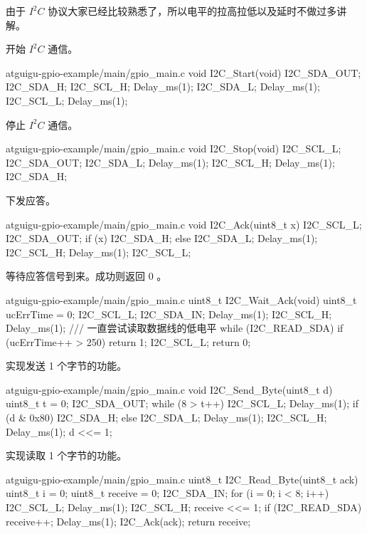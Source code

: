 \documentclass[lang=cn,newtx,10pt,scheme=chinese]{elegantbook}
\begin{document}
由于 $I^2C$ 协议大家已经比较熟悉了，所以电平的拉高拉低以及延时不做过多讲解。

开始 $I^2C$ 通信。

\begin{mycode}{atguigu-gpio-example/main/gpio\_main.c}
void I2C_Start(void)
{
    I2C_SDA_OUT;
    I2C_SDA_H;
    I2C_SCL_H;
    Delay_ms(1);
    I2C_SDA_L;
    Delay_ms(1);
    I2C_SCL_L;
    Delay_ms(1);
}
\end{mycode}

停止 $I^2C$ 通信。

\begin{mycode}{atguigu-gpio-example/main/gpio\_main.c}
void I2C_Stop(void)
{
    I2C_SCL_L;
    I2C_SDA_OUT;
    I2C_SDA_L;
    Delay_ms(1);
    I2C_SCL_H;
    Delay_ms(1);
    I2C_SDA_H;
}
\end{mycode}

下发应答。

\begin{mycode}{atguigu-gpio-example/main/gpio\_main.c}
void I2C_Ack(uint8_t x)
{
    I2C_SCL_L;
    I2C_SDA_OUT;
    if (x)
    {
        I2C_SDA_H;
    }
    else
    {
        I2C_SDA_L;
    }
    Delay_ms(1);
    I2C_SCL_H;
    Delay_ms(1);
    I2C_SCL_L;
}
\end{mycode}

等待应答信号到来。成功则返回 0 。

\begin{mycode}{atguigu-gpio-example/main/gpio\_main.c}
uint8_t I2C_Wait_Ack(void)
{
    uint8_t ucErrTime = 0;
    I2C_SCL_L;
    I2C_SDA_IN;
    Delay_ms(1);
    I2C_SCL_H;
    Delay_ms(1);
    /// 一直尝试读取数据线的低电平
    while (I2C_READ_SDA)
    {
        if (ucErrTime++ > 250)
        {
            return 1;
        }
    }
    I2C_SCL_L;
    return 0;
}
\end{mycode}

实现发送 1 个字节的功能。

\begin{mycode}{atguigu-gpio-example/main/gpio\_main.c}
void I2C_Send_Byte(uint8_t d)
{
    uint8_t t = 0;
    I2C_SDA_OUT;
    while (8 > t++)
    {
        I2C_SCL_L;
        Delay_ms(1);
        if (d & 0x80)
        {
            I2C_SDA_H;
        }
        else
        {
            I2C_SDA_L;
        }
        Delay_ms(1);
        I2C_SCL_H;
        Delay_ms(1);
        d <<= 1;
    }
}
\end{mycode}

实现读取 1 个字节的功能。

\begin{mycode}{atguigu-gpio-example/main/gpio\_main.c}
uint8_t I2C_Read_Byte(uint8_t ack)
{
    uint8_t i = 0;
    uint8_t receive = 0;
    I2C_SDA_IN;
    for (i = 0; i < 8; i++)
    {
        I2C_SCL_L;
        Delay_ms(1);
        I2C_SCL_H;
        receive <<= 1;
        if (I2C_READ_SDA)
        {
            receive++;
        }
        Delay_ms(1);
    }
    I2C_Ack(ack);
    return receive;
}
\end{mycode}
\end{document}

